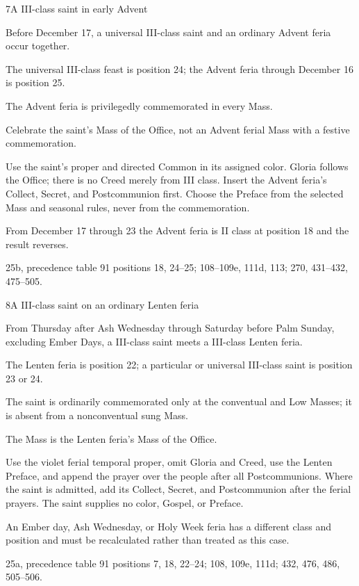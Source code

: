 \begin{casefile}{7}{A III-class saint in early Advent}
\item[Calendar facts] Before December 17, a universal III-class saint and an ordinary Advent feria occur together.
\item[Ranks and rows] The universal III-class feast is position 24; the Advent feria through December 16 is position 25.
\item[Impeded item] The Advent feria is privilegedly commemorated in every Mass.
\item[Mass category] Celebrate the saint's Mass of the Office, not an Advent ferial Mass with a festive commemoration.
\item[Assembly] Use the saint's proper and directed Common in its assigned color.  Gloria follows the Office; there is no Creed merely from III class.  Insert the Advent feria's Collect, Secret, and Postcommunion first.  Choose the Preface from the selected Mass and seasonal rules, never from the commemoration.
\item[Boundary] From December 17 through 23 the Advent feria is II class at position 18 and the result reverses.
\item[Rubric locus] 25b, precedence table 91 positions 18, 24--25; 108--109e, 111d, 113; 270, 431--432, 475--505.
\end{casefile}

\begin{casefile}{8}{A III-class saint on an ordinary Lenten feria}
\item[Calendar facts] From Thursday after Ash Wednesday through Saturday before Palm Sunday, excluding Ember Days, a III-class saint meets a III-class Lenten feria.
\item[Ranks and rows] The Lenten feria is position 22; a particular or universal III-class saint is position 23 or 24.
\item[Impeded item] The saint is ordinarily commemorated only at the conventual and Low Masses; it is absent from a nonconventual sung Mass.
\item[Mass category] The Mass is the Lenten feria's Mass of the Office.
\item[Assembly] Use the violet ferial temporal proper, omit Gloria and Creed, use the Lenten Preface, and append the prayer over the people after all Postcommunions.  Where the saint is admitted, add its Collect, Secret, and Postcommunion after the ferial prayers.  The saint supplies no color, Gospel, or Preface.
\item[Boundary] An Ember day, Ash Wednesday, or Holy Week feria has a different class and position and must be recalculated rather than treated as this case.
\item[Rubric locus] 25a, precedence table 91 positions 7, 18, 22--24; 108, 109e, 111d; 432, 476, 486, 505--506.
\end{casefile}

